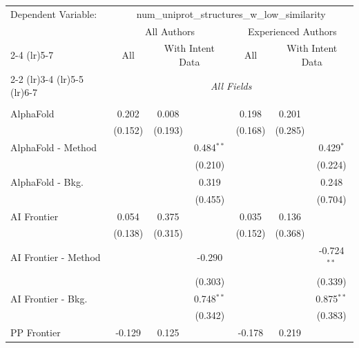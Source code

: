 \begingroup
\centering
\begin{tabular}{lcccccc}
   \tabularnewline \midrule \midrule
   Dependent Variable: & \multicolumn{6}{c}{num\_uniprot\_structures\_w\_low\_similarity}\\
 & \multicolumn{3}{c}{All Authors} & \multicolumn{3}{c}{Experienced Authors} \\
\cmidrule(lr){2-4} \cmidrule(lr){5-7}
 & \multicolumn{1}{c}{All} & \multicolumn{2}{c}{With Intent Data} & \multicolumn{1}{c}{All} & \multicolumn{2}{c}{With Intent Data} \\
\cmidrule(lr){2-2} \cmidrule(lr){3-4} \cmidrule(lr){5-5} \cmidrule(lr){6-7}
 & \multicolumn{6}{c}{\textit{All Fields}} \\ \\
   AlphaFold            & 0.202         & 0.008   &              & 0.198         & 0.201   &   \\   
                        & (0.152)       & (0.193) &              & (0.168)       & (0.285) &   \\   
   AlphaFold - Method   &               &         & 0.484$^{**}$ &               &         & 0.429$^{*}$\\   
                        &               &         & (0.210)      &               &         & (0.224)\\   
   AlphaFold - Bkg.     &               &         & 0.319        &               &         & 0.248\\   
                        &               &         & (0.455)      &               &         & (0.704)\\   
   AI Frontier          & 0.054         & 0.375   &              & 0.035         & 0.136   &   \\   
                        & (0.138)       & (0.315) &              & (0.152)       & (0.368) &   \\   
   AI Frontier - Method &               &         & -0.290       &               &         & -0.724$^{**}$\\   
                        &               &         & (0.303)      &               &         & (0.339)\\   
   AI Frontier - Bkg.   &               &         & 0.748$^{**}$ &               &         & 0.875$^{**}$\\   
                        &               &         & (0.342)      &               &         & (0.383)\\   
   PP Frontier          & -0.129        & 0.125   &              & -0.178        & 0.219   &   \\   

\end{tabular}
